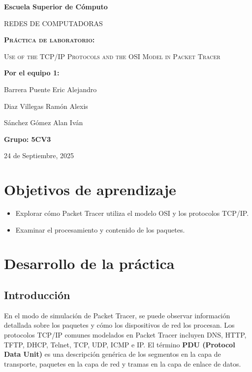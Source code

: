 \documentclass[a4paper,11pt]{article}
\begin{document}
\vspace{0.4cm}

\begin{titlepage}
    \centering
    {\bfseries\LARGE Escuela Superior de Cómputo \par}
    \vspace{1cm}
    {\scshape\Large REDES DE COMPUTADORAS \par}
    \vspace{5cm}
    {\scshape\Huge \textbf{Práctica de laboratorio:} \par}
    {\scshape\Huge Use of the TCP/IP Protocols and the OSI Model in Packet Tracer \par}
    \vfill
    {\Large \textbf{Por el equipo 1:} \par}
    {\Large Barrera Puente Eric Alejandro \par}
    {\Large Diaz Villegas Ramón Alexis \par}
    {\Large Sánchez Gómez Alan Iván \par}
    \vspace{1cm}
    {\Large \textbf{Grupo: 5CV3} \par}
    \vfill
    {\Large 24 de Septiembre, 2025 \par}
\end{titlepage}

\tableofcontents %
\newpage

\listoffigures
\newpage

\justify
\section{Objetivos de aprendizaje}
\begin{itemize}
    \item Explorar cómo Packet Tracer utiliza el modelo OSI y los protocolos TCP/IP.
    \item Examinar el procesamiento y contenido de los paquetes.
\end{itemize}

\section{Desarrollo de la práctica}

\subsection{Introducción}
En el modo de simulación de Packet Tracer, se puede observar información detallada sobre los paquetes y cómo los dispositivos de red los procesan. Los protocolos TCP/IP comunes modelados en Packet Tracer incluyen DNS, HTTP, TFTP, DHCP, Telnet, TCP, UDP, ICMP e IP. El término \textbf{PDU (Protocol Data Unit)} es una descripción genérica de los segmentos en la capa de transporte, paquetes en la capa de red y tramas en la capa de enlace de datos.
\end{document}
